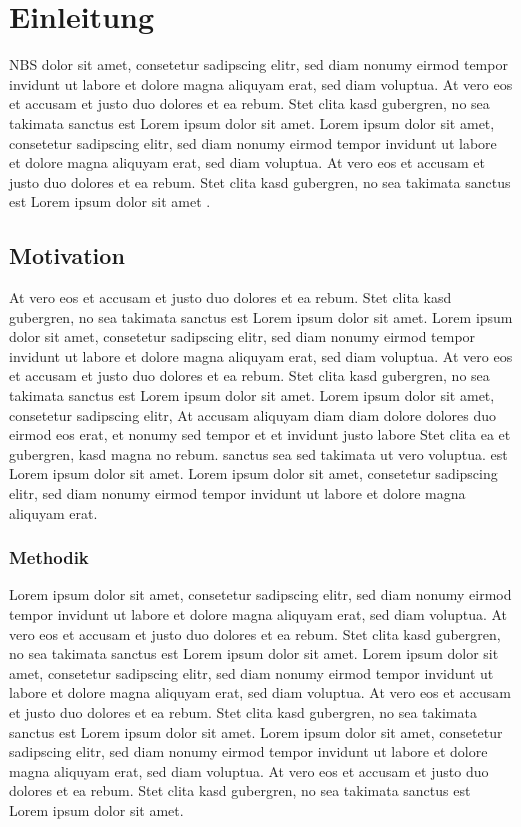 \section{Einleitung}
\ac{NBS} dolor sit amet, consetetur sadipscing elitr, sed diam nonumy eirmod tempor invidunt ut labore et dolore magna aliquyam erat, sed diam voluptua. At vero eos et accusam et justo duo dolores et ea rebum. Stet clita kasd gubergren, no sea takimata sanctus est Lorem ipsum dolor sit amet. Lorem ipsum dolor sit amet, consetetur sadipscing elitr, sed diam nonumy eirmod tempor invidunt ut labore et dolore magna aliquyam erat, sed diam voluptua. At vero eos et accusam et justo duo dolores et ea rebum. Stet clita kasd gubergren, no sea takimata sanctus est Lorem ipsum dolor sit amet \autocite{LoremIpsum}.

\subsection{Motivation}
At vero eos et accusam et justo duo dolores et ea rebum. Stet clita kasd gubergren, no sea takimata sanctus est Lorem ipsum dolor sit amet. Lorem ipsum dolor sit amet, consetetur sadipscing elitr, sed diam nonumy eirmod tempor invidunt ut labore et dolore magna aliquyam erat, sed diam voluptua. At vero eos et accusam et justo duo dolores et ea rebum. Stet clita kasd gubergren, no sea takimata sanctus est Lorem ipsum dolor sit amet. Lorem ipsum dolor sit amet, consetetur sadipscing elitr, At accusam aliquyam diam diam dolore dolores duo eirmod eos erat, et nonumy sed tempor et et invidunt justo labore Stet clita ea et gubergren, kasd magna no rebum. sanctus sea sed takimata ut vero voluptua. est Lorem ipsum dolor sit amet. Lorem ipsum dolor sit amet, consetetur sadipscing elitr, sed diam nonumy eirmod tempor invidunt ut labore et dolore magna aliquyam erat. 

\subsubsection{Methodik}
Lorem ipsum dolor sit amet, consetetur sadipscing elitr, sed diam nonumy eirmod tempor invidunt ut labore et dolore magna aliquyam erat, sed diam voluptua. At vero eos et accusam et justo duo dolores et ea rebum. Stet clita kasd gubergren, no sea takimata sanctus est Lorem ipsum dolor sit amet. Lorem ipsum dolor sit amet, consetetur sadipscing elitr, sed diam nonumy eirmod tempor invidunt ut labore et dolore magna aliquyam erat, sed diam voluptua. At vero eos et accusam et justo duo dolores et ea rebum. Stet clita kasd gubergren, no sea takimata sanctus est Lorem ipsum dolor sit amet. Lorem ipsum dolor sit amet, consetetur sadipscing elitr, sed diam nonumy eirmod tempor invidunt ut labore et dolore magna aliquyam erat, sed diam voluptua. At vero eos et accusam et justo duo dolores et ea rebum. Stet clita kasd gubergren, no sea takimata sanctus est Lorem ipsum dolor sit amet.

